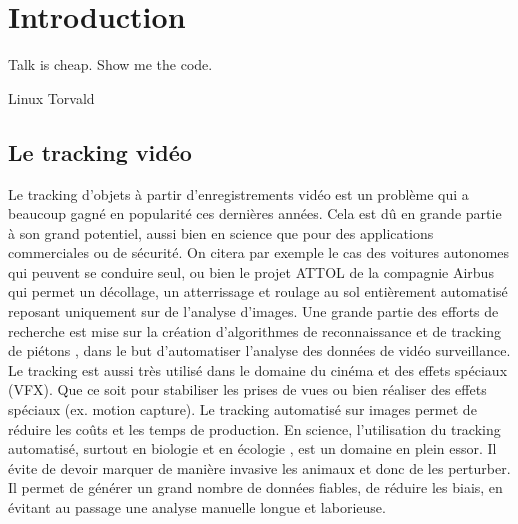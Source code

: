 \chapter{Introduction}

  \epigraph{Talk is cheap. Show me the code.}{Linux Torvald}

	\section{Le tracking vidéo}
	
  Le tracking d'objets à partir d'enregistrements vidéo est un problème qui a beaucoup gagné en popularité ces dernières années. Cela est dû en grande partie à son grand potentiel, aussi bien en science que pour des applications commerciales ou de sécurité. On citera par exemple le cas des voitures autonomes \cite{viswanathan2017applications} qui peuvent se conduire seul, ou bien le projet ATTOL \cite{ATTOL} de la compagnie Airbus qui permet un décollage, un atterrissage et roulage au sol entièrement automatisé reposant uniquement sur de l'analyse d'images. Une grande partie des efforts de recherche est mise sur la création d'algorithmes de reconnaissance et de tracking de piétons \cite{}, dans le but d'automatiser l'analyse des données de vidéo surveillance. Le tracking est aussi très utilisé dans le domaine du cinéma et des effets spéciaux (VFX). Que ce soit pour stabiliser les prises de vues ou bien réaliser des effets spéciaux (ex. motion capture). Le tracking automatisé sur images permet de réduire les coûts et les temps de production. En science, l'utilisation du tracking automatisé, surtout en biologie et en écologie \cite{dell2014automated}, est un domaine en plein essor. Il évite de devoir marquer de manière invasive les animaux et donc de les perturber. Il permet de générer un grand nombre de données fiables, de réduire les biais, en évitant au passage une analyse manuelle longue et laborieuse.\\

